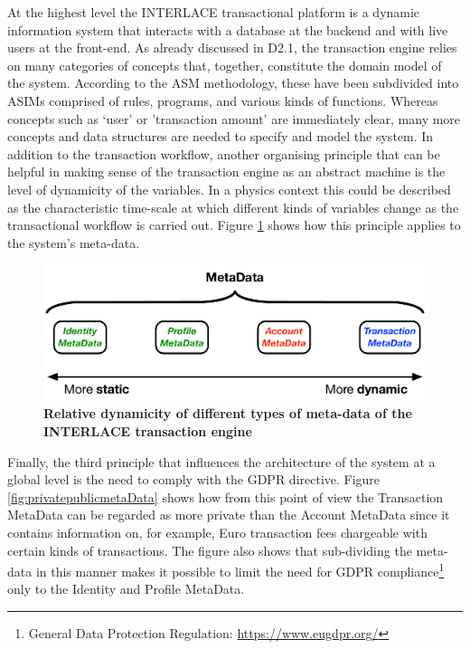 At the highest level the INTERLACE transactional platform is a dynamic information system that interacts with a database at the backend and with live users at the front-end. As already discussed in D2.1, the transaction engine relies on many categories of concepts that, together, constitute the domain model of the system. According to the ASM methodology, these have been subdivided into ASIMs comprised of rules, programs, and various kinds of functions. Whereas concepts such as `user' or 'transaction amount' are immediately clear, many more concepts and data structures are needed to specify and model the system. In addition to the transaction workflow, another organising principle that can be helpful in making sense of the transaction engine as an abstract machine is the level of dynamicity of the variables. In a physics context this could be described as the characteristic time-scale at which different kinds of variables change as the transactional workflow is carried out. Figure \ref{fig:staticdynamicmetadata} shows how this principle applies to the system's meta-data.
\begin{figure}[h]
\centering
\includegraphics[width=13cm]{Figures/Static_Dynamic_MetaData}
\caption{\small\textbf{Relative dynamicity of different types of meta-data of the INTERLACE transaction engine}}
\label{fig:staticdynamicmetadata}
\end{figure}

Finally, the third principle that influences the architecture of the system at a global level is the need to comply with the GDPR directive. Figure \ref{fig:privatepublicmetaData} shows how from this point of view the Transaction MetaData can be regarded as more private than the Account MetaData since it contains information on, for example, Euro transaction fees chargeable with certain kinds of transactions. The figure also shows that sub-dividing the meta-data in this manner makes it possible to limit the need for GDPR compliance\footnote{General Data Protection Regulation: \url{https://www.eugdpr.org/}} only to the
Identity and Profile MetaData.

